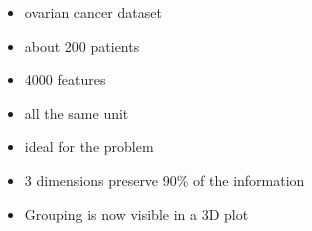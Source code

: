 \begin{itemize}
  \item ovarian cancer dataset
  \item about 200 patients
  \item 4000 features
  \item all the same unit
  \item ideal for the problem
  \item 3 dimensions preserve 90\% of the information
  \item Grouping is now visible in a 3D plot
\end{itemize}
